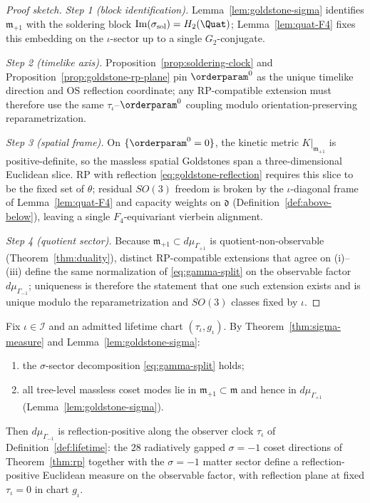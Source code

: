\begin{proof}[Proof sketch]
\emph{Step 1 (block identification).} Lemma~\ref{lem:goldstone-sigma}
identifies $\mathfrak{m}_{+1}$ with the soldering block
$\mathrm{Im}(\sigma_{\mathrm{sol}})=H_2(\Quat)$; Lemma~\ref{lem:quat-F4}
fixes this embedding on the $\iota$-sector up to a single $G_2$-conjugate.

\emph{Step 2 (timelike axis).} Proposition~\ref{prop:soldering-clock} and
Proposition~\ref{prop:goldstone-rp-plane} pin $\orderparam^0$ as the unique
timelike direction and OS reflection coordinate; any RP-compatible extension
must therefore use the same $\tau_\iota$--$\orderparam^0$ coupling modulo
orientation-preserving reparametrization.

\emph{Step 3 (spatial frame).} On $\{\orderparam^0=0\}$, the kinetic metric
$K|_{\mathfrak{m}_{+1}}$ is positive-definite, so the massless spatial
Goldstones span a three-dimensional Euclidean slice. RP with reflection
\eqref{eq:goldstone-reflection} requires this slice to be the fixed set of
$\theta$; residual $SO(3)$ freedom is broken by the $\iota$-diagonal frame
of Lemma~\ref{lem:quat-F4} and capacity weights on $\mathfrak{d}$
(Definition~\ref{def:above-below}), leaving a single $F_4$-equivariant
vierbein alignment.

\emph{Step 4 (quotient sector).} Because $\mathfrak{m}_{+1}\subset
d\mu_{\Gamma_{+1}}$ is quotient-non-observable
(Theorem~\ref{thm:duality}), distinct RP-compatible extensions that agree on
(i)--(iii) define the same normalization of \eqref{eq:gamma-split} on the
observable factor $d\mu_{\Gamma_{-1}}$; uniqueness is therefore the statement
that one such extension exists and is unique modulo the reparametrization and
$SO(3)$ classes fixed by $\iota$.
\end{proof}

\begin{theorem}
\label{thm:rp-gamma-neg}
Fix $\iota\in\mathcal{I}$ and an admitted lifetime chart
$(\tau_\iota,g_\iota)$. By Theorem~\ref{thm:sigma-measure} and
Lemma~\ref{lem:goldstone-sigma}:
\begin{enumerate}[label=(\roman*),leftmargin=*]
  \item the $\sigma$-sector decomposition \eqref{eq:gamma-split} holds;
  \item all tree-level massless coset modes lie in
    $\mathfrak{m}_{+1}\subset\mathfrak{m}$ and hence in $d\mu_{\Gamma_{+1}}$
    (Lemma~\ref{lem:goldstone-sigma}).
\end{enumerate}
Then $d\mu_{\Gamma_{-1}}$ is reflection-positive along the observer clock
$\tau_\iota$ of Definition~\ref{def:lifetime}: the $28$ radiatively gapped
$\sigma=-1$ coset directions of Theorem~\ref{thm:rp} together with the
$\sigma=-1$ matter sector define a reflection-positive Euclidean measure on
the observable factor, with reflection plane at fixed $\tau_\iota=0$ in chart
$g_\iota$.
\end{theorem}

